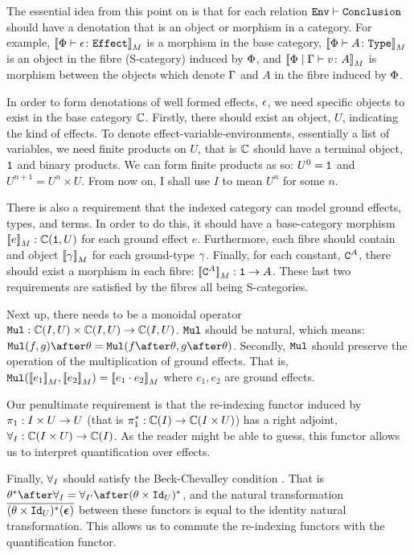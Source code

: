 \documentclass{Report}
\begin{document}
The essential idea from this point on is that for each relation $\wellformed{\texttt{Env}}{\texttt{Conclusion}}$ should have a denotation that is an object or morphism in a category. For example, $\deno{\typerelation{\P}{\e}{\effect}}$ is a morphism in the base category, $\deno{\typerelation{\P}{A}{\type}}$ is an object in the fibre (S-category) induced by $\P$, and $\deno{\gpetyperelation{v}{A}}$ is morphism between the objects which denote $\G$ and $A$ in the fibre induced by $\P$.

In order to form denotations of well formed effects, $\e$, we need specific objects to exist in the base category $\C$. Firstly, there should exist an object, $U$, indicating the kind of effects. To denote effect-variable-environments, essentially a list of variables, we need finite products on $U$, that is $\C$ should have a terminal object, $\1$ and binary products. We can form finite products as so: $U^0 = \1$ and $U^{n+1} = U^n\times U$. From now on, I shall use $I$ to mean $U^n$ for some $n$.

There is also a requirement that the indexed category can model ground effects, types, and terms. In order to do this, it should have a base-category morphism $\deno{e}: \C(\1, U)$ for each ground effect $e$. Furthermore, each fibre should contain and object $\deno{\g}$ for each ground-type $\g$. Finally, for each constant, $\const{A}$, there should exist a morphism in each fibre: $\deno{\const{A}}: \1 \rightarrow A$. These last two requirements are satisfied by the fibres all being S-categories.

Next up, there needs to be a monoidal operator $\Mul: \ciu \times \ciu \rightarrow \ciu$. $\Mul$ should be natural, which means: $\Mul(f, g)\after\theta = \Mul(f\after\theta, g\after\theta)$. Secondly, $\Mul$ should preserve the operation of the multiplication of ground effects. That is, $\Mul(\deno{e_1},\deno{e_2}) = \deno{e_1\dot e_2}$ where $e_1, e_2$ are ground effects.

Our penultimate requirement is that the re-indexing functor  induced by $\p: I\times U\rightarrow U$ (that is $\pstar: \C(I) \rightarrow \C(I\times U)$) has a right adjoint, $\allI: \C(I\times U) \rightarrow \C(I)$. As the reader might be able to guess, this functor allows us to interpret quantification over effects.

Finally, $\allI$ should satisfy the Beck-Chevalley condition . That is $\theta\star\after\allI = \allII\after(\theta\times\Id{U})\star$, and the natural transformation $\bar{(\theta\times\Id{U})\star(\counit{})}$ between these functors is equal to the identity natural transformation. This allows us to commute the re-indexing functors with the quantification functor.
\end{document}
